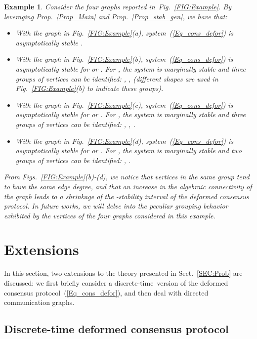 \documentclass[letterpaper,9pt,twocolumn]{autart}
\newtheorem{example}{\textbf{Example}}
\begin{document}
\begin{example}\label{Example}
Consider the four graphs reported in~Fig.~\ref{FIG:Example}. By leveraging Prop.~\ref{Prop_Main}
and Prop.~\ref{Prop_stab_gen}, we have that:
\begin{itemize}
\item With the graph in Fig.~\ref{FIG:Example}(a), system~(\ref{Eq_cons_defor})
is asymptotically stable .
\item With the graph in Fig.~\ref{FIG:Example}(b), system~(\ref{Eq_cons_defor})
is asymptotically stable for  or . For , the
system is marginally stable and three groups of vertices can be identified:
, ,  (different shapes are used in Fig.~\ref{FIG:Example}(b)
to indicate these groups).
\item With the graph in Fig.~\ref{FIG:Example}(c), system~(\ref{Eq_cons_defor})
is asymptotically stable for  or . For ,
the system is marginally stable and three groups of vertices can be identified: , , .
\item With the graph in Fig.~\ref{FIG:Example}(d), system~(\ref{Eq_cons_defor})
is asymptotically stable for  or . For ,
the system is marginally stable and two groups of vertices can be identified: , .
\end{itemize}
From Figs.~\ref{FIG:Example}(b)-(d), we notice that vertices in the same
group tend to have the same edge degree,
and that an increase in the algebraic connectivity of the graph leads
to a shrinkage of the -stability interval of the deformed consensus
protocol. In future works, we will delve into 
the peculiar grouping behavior exhibited by the vertices of the four
graphs considered in this example.~\hfill
\end{example}


\section{Extensions}\label{Sect:ext}

In this section, two extensions to the theory presented in
Sect.~\ref{SEC:Prob} are discussed: we first briefly consider
a \mbox{discrete-time version} of the deformed consensus 
protocol~(\ref{Eq_cons_defor}), and then deal with directed 
communication graphs.

\subsection{Discrete-time deformed consensus protocol}\label{Sect:ext_DT}
\end{document}
